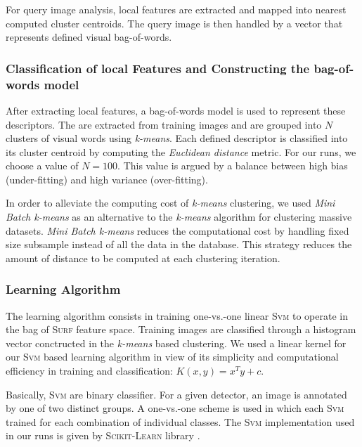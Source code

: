 				For query image analysis, local features are extracted and mapped into 
				nearest computed cluster centroids. The query image is then handled by a 
				vector that represents defined visual bag-of-words.

			\subsubsection{Classification of local Features and Constructing the bag-of-words model}
				After extracting local features, a bag-of-words model is used to represent these descriptors. 
				The  are extracted from training images and are grouped into $N$ clusters of 
				visual words using \textit{k-means}.	
				Each  defined descriptor is classified into its cluster centroid by computing the 
				\textit{Euclidean distance} metric. For our runs, we choose a value of $N = 100$. 
				This value is argued by a balance between high bias (under-fitting) and high variance (over-fitting).
				
				In order to alleviate the computing cost of \textit{k-means} clustering, we used 
				\textit{Mini Batch k-means} 
				\cite{Sculley2010} as an alternative to the \textit{k-means} algorithm for clustering massive 
				datasets. \textit{Mini Batch k-means} reduces the computational cost by handling fixed size 
				subsample instead of all the data in the database. This strategy reduces the amount 
				of distance to be computed at each clustering iteration.

			\subsubsection{Learning Algorithm}
				The learning algorithm consists in training one-vs.-one linear \textsc{Svm}
				to operate in the bag of \textsc{Surf} feature space. Training images are classified
				through a histogram vector conctructed in the \textit{k-means} based clustering.
				We used a linear kernel for our \textsc{Svm} based learning algorithm in view of its simplicity and 					computational efficiency in training and classification: $K(x,y) = x^{T}y+c$.

				Basically, \textsc{Svm} are binary classifier. For a given detector, an image 
				is annotated by one of two distinct groups. A one-vs.-one scheme is used in which 
				each \textsc{Svm} trained for each combination of individual classes. 
				The \textsc{Svm} implementation used in our runs is given by \textsc{Scikit-Learn} 
				library \citep{Pedregosa2011}.

